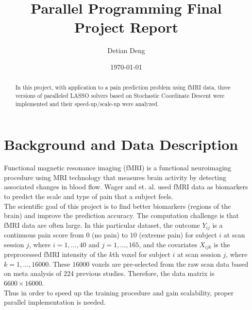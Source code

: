\documentclass[11 pt, a4paper]{article}  %
\begin{document}
\title{Parallel Programming Final Project Report}   %
\author{Detian Deng}         %
\date{\today}    %
\maketitle

\begin{abstract}
In this project, with application to a pain prediction problem using fMRI data, three versions of paralleled LASSO solvers based on Stochastic Coordinate Descent were implemented and their speed-up/scale-up were analyzed. 
\end{abstract}

\section{Background and Data Description}
Functional magnetic resonance imaging (fMRI) is a functional neuroimaging procedure using MRI technology that measures brain activity by detecting associated changes in blood flow. Wager and et. al. used fMRI data as biomarkers to predict the scale and type of pain that a subject feels. \cite{wager2013fmri} \\ 
The scientific goal of this project is to find better biomarkers (regions of the brain) and improve the prediction accuracy. The computation challenge is that fMRI data are often large. %
In this particular dataset, the outcome $Y_{ij}$ is a continuous pain score from $0$ (no pain) to $10$ (extreme pain) for subject $i$ at scan session $j$, where $i = 1,\ldots,40$ and $j= 1,\ldots, 165$, and the covariates $X_{ijk}$ is the preprocessed fMRI intensity of the $k$th voxel for subject $i$ at scan session $j$, where $k=1,\ldots, 16000$. These $16000$ voxels are pre-selected from the raw scan data based on meta analysis of 224 previous studies. Therefore, the data matrix is $6600 \times 16000$.\\
Thus in order to speed up the training procedure and gain scalability, proper parallel implementation is needed.
\end{document}
